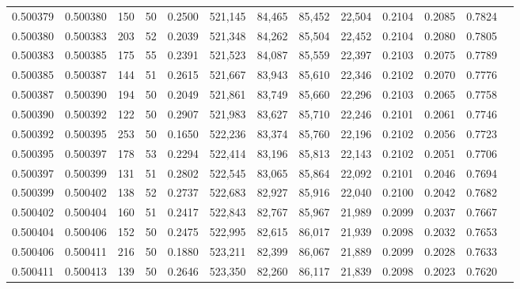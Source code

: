 \begin{tabular}{rrrrrrrrrrrrr}
0.500379 & 0.500380 & 150 &  50 &                                     0.2500 & 521,145 &  84,465 &  85,452 &  22,504 & 0.2104 & 0.2085 & 0.7824 \\
0.500380 & 0.500383 & 203 &  52 &                                     0.2039 & 521,348 &  84,262 &  85,504 &  22,452 & 0.2104 & 0.2080 & 0.7805 \\
0.500383 & 0.500385 & 175 &  55 &                                     0.2391 & 521,523 &  84,087 &  85,559 &  22,397 & 0.2103 & 0.2075 & 0.7789 \\
0.500385 & 0.500387 & 144 &  51 &                                     0.2615 & 521,667 &  83,943 &  85,610 &  22,346 & 0.2102 & 0.2070 & 0.7776 \\
0.500387 & 0.500390 & 194 &  50 &                                     0.2049 & 521,861 &  83,749 &  85,660 &  22,296 & 0.2103 & 0.2065 & 0.7758 \\
0.500390 & 0.500392 & 122 &  50 &                                     0.2907 & 521,983 &  83,627 &  85,710 &  22,246 & 0.2101 & 0.2061 & 0.7746 \\
0.500392 & 0.500395 & 253 &  50 &                                     0.1650 & 522,236 &  83,374 &  85,760 &  22,196 & 0.2102 & 0.2056 & 0.7723 \\
0.500395 & 0.500397 & 178 &  53 &                                     0.2294 & 522,414 &  83,196 &  85,813 &  22,143 & 0.2102 & 0.2051 & 0.7706 \\
0.500397 & 0.500399 & 131 &  51 &                                     0.2802 & 522,545 &  83,065 &  85,864 &  22,092 & 0.2101 & 0.2046 & 0.7694 \\
0.500399 & 0.500402 & 138 &  52 &                                     0.2737 & 522,683 &  82,927 &  85,916 &  22,040 & 0.2100 & 0.2042 & 0.7682 \\
0.500402 & 0.500404 & 160 &  51 &                                     0.2417 & 522,843 &  82,767 &  85,967 &  21,989 & 0.2099 & 0.2037 & 0.7667 \\
0.500404 & 0.500406 & 152 &  50 &                                     0.2475 & 522,995 &  82,615 &  86,017 &  21,939 & 0.2098 & 0.2032 & 0.7653 \\
0.500406 & 0.500411 & 216 &  50 &                                     0.1880 & 523,211 &  82,399 &  86,067 &  21,889 & 0.2099 & 0.2028 & 0.7633 \\
0.500411 & 0.500413 & 139 &  50 &                                     0.2646 & 523,350 &  82,260 &  86,117 &  21,839 & 0.2098 & 0.2023 & 0.7620 \\

\end{tabular}
